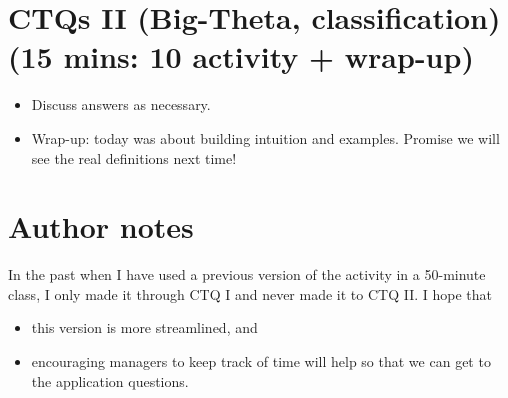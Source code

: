 \documentclass{tufte-handout}
\begin{document}
\section{CTQs II (Big-Theta, classification) (15 mins: 10 activity + wrap-up)}

\begin{itemize}
\item Discuss answers as necessary.
\item Wrap-up: today was about building intuition and
  examples. Promise we will see the real definitions next time!
\end{itemize}

\newpage

\section{Author notes}
\label{sec:author}

In the past when I have used a previous version of the activity in a
50-minute class, I only made it through CTQ I and never made it to CTQ
II.  I hope that
\begin{itemize}
\item this version is more streamlined, and
\item encouraging managers to keep track of time will help so that we
  can get to the application questions.
\end{itemize}
\end{document}
